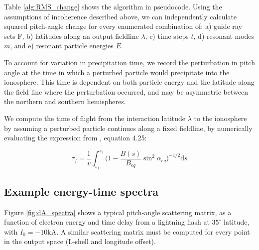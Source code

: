 Table \ref{alg:RMS_change} shows the algorithm in pseudocode. Using the assumptions of incoherence described above, we can independently calculate squared pitch-angle change for every enumerated combination of: a) guide ray sets F, b) latitudes along an output fieldline $\lambda$, c) time steps $t$, d) resonant modes $m$, and e) resonant particle energies $E$. 

To account for variation in precipitation time, we record the perturbation in pitch angle at the time in which a perturbed particle would precipitate into the ionosphere. This time is dependent on both particle energy and the latitude along the field line where the perturbation occurred, and may be asymmetric between the northern and southern hemispheres.

We compute the time of flight from the interaction latitude $\lambda$ to the ionosphere by assuming a perturbed particle continues along a fixed fieldline, by numerically evaluating the expression from \cite{Walt1994}, equation 4.25:

\begin{equation}
\tau_f =  \frac{1}{v} \int_{s_1}^{s_2} \bigg(1 - \frac{B(s)}{B_{eq}}\sin^2\alpha_{eq}\bigg)^{-1/2} \mathrm{d}s
\label{eqn:bounce_time}
\end{equation}

\subsection{Example energy-time spectra}
Figure \ref{fig:dA_spectra} shows a typical pitch-angle scattering matrix, as a function of electron energy and time delay from a lightning flash at $35^\circ$ latitude, with $I_0=-10$kA. A similar scattering matrix must be computed for every point in the output space (L-shell and longitude offset).

